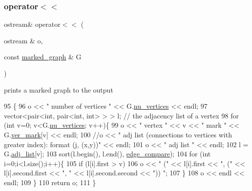 \subsubsection{\texorpdfstring{operator$<$$<$}{operator<<}}
{\footnotesize\ttfamily ostream\& operator$<$$<$ (\begin{DoxyParamCaption}\item[{ostream \&}]{o,  }\item[{const \hyperlink{classmarked__graph}{marked\+\_\+graph} \&}]{G }\end{DoxyParamCaption})\hspace{0.3cm}{\ttfamily [friend]}}



prints a marked graph to the output 


\begin{DoxyCode}
95 \{
96   o << \textcolor{stringliteral}{" number of vertices "} << G.\hyperlink{classmarked__graph_acf79c6aeb8f32614cb14a5baaa6c9f9b}{nu\_vertices} << endl;
97   vector<pair<int, pair<int, int> > > l; \textcolor{comment}{// the adjacency list of a vertex}
98   \textcolor{keywordflow}{for} (\textcolor{keywordtype}{int} v=0; v<G.\hyperlink{classmarked__graph_acf79c6aeb8f32614cb14a5baaa6c9f9b}{nu\_vertices}; v++)\{
99     o << \textcolor{stringliteral}{" vertex "} << v << \textcolor{stringliteral}{" mark "} << G.\hyperlink{classmarked__graph_ac83e9377dd4d8bb95be1ac949b127296}{ver\_mark}[v] << endl;
100     \textcolor{comment}{//o << " adj list (connections to vertices with greater index): format (j, (x,y))" << endl;}
101     o << \textcolor{stringliteral}{" adj list "} << endl;
102     l = G.\hyperlink{classmarked__graph_a1a0bf7ca413a278763f7c878b3b6fd6f}{adj\_list}[v];
103     sort(l.begin(), l.end(), \hyperlink{marked__graph_8cpp_a09dd24caed50b1d106e10538e688b6ac}{edge\_compare});
104     \textcolor{keywordflow}{for} (\textcolor{keywordtype}{int} i=0;i<l.size();i++)\{
105       \textcolor{keywordflow}{if} (l[i].first > v)
106         o << \textcolor{stringliteral}{" ("} << l[i].first << \textcolor{stringliteral}{", ("} << l[i].second.first << \textcolor{stringliteral}{", "} << l[i].second.second << \textcolor{stringliteral}{")) "};
107     \}
108     o << endl << endl;
109   \}
110   \textcolor{keywordflow}{return} o;
111 \}
\end{DoxyCode}
\mbox{\label{classmarked__graph_a1718b82e881f8c37552018df1f83f82c}} 
